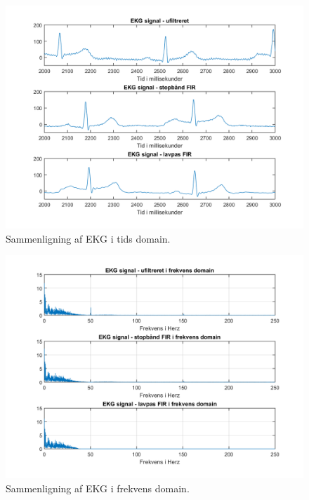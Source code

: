 \documentclass[12pt, letterpaper]{article}
\begin{document}
\begin{figure}[!h]
           \includegraphics[width=\linewidth]{billeder/EKGtidsdomain}	   							\caption{Sammenligning af EKG i tids domain.}
\end{figure}

\begin{figure}[!h]
           \includegraphics[width=\linewidth]{billeder/EKGfrekvensdomain}	   							\caption{Sammenligning af EKG i frekvens domain.}
\end{figure}




\end{document}
